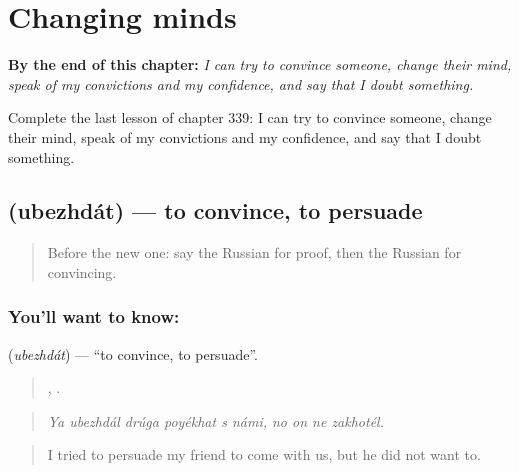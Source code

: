 
\chapter{Changing minds}
\label{ch:ru-changing-minds}

\begin{chapteropening}
\textbf{By the end of this chapter:} \emph{I can try to convince someone, change their mind, speak of my convictions and my confidence, and say that I doubt something.}

Complete the last lesson of chapter 339: I can try to convince someone, change their mind, speak of my convictions and my confidence, and say that I doubt something.
\end{chapteropening}

\section[\texorpdfstring{\ru{убеждать} (ubezhdát)}{убеждать (ubezhdát)}]{ (ubezhdát) — to convince, to persuade}

\label{lesson:RU-C339-ubezhdat}



\begin{quote}
Before the new one: say the Russian for proof, then the Russian for convincing.
\end{quote}

\subsection*{You'll want to know: }
\textbf{} (\emph{ubezhdát}) — \textquotedblleft{}to convince, to persuade\textquotedblright{}.

\begin{quote}
     ,    .
\end{quote}

\begin{quote}
\emph{Ya ubezhdál drúga poyékhat s námi, no on ne zakhotél.}
\end{quote}

\begin{quote}
I tried to persuade my friend to come with us, but he did not want to.
\end{quote}

